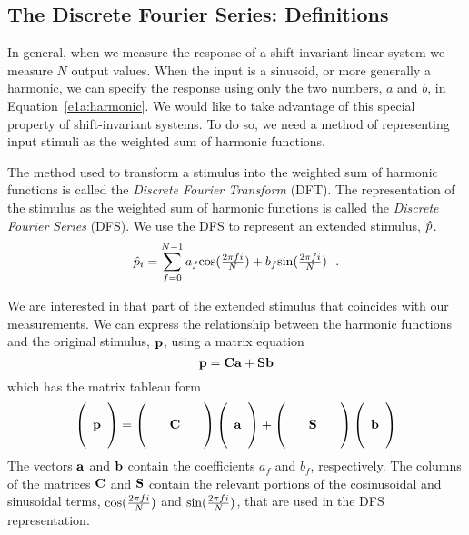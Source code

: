\subsection*{The Discrete Fourier Series:  Definitions}
In general, when we measure the response of a shift-invariant linear
system we measure $N$ output values.  When the input is a sinusoid, or
more generally a harmonic, we can specify the response using only the
two numbers, $a$ and $b$, in Equation~\ref{e1a:harmonic}.  We would
like to take advantage of this special property of shift-invariant systems.  To
do so, we need a method of representing input stimuli as the weighted
sum of harmonic functions.

The method used to transform a stimulus into the weighted sum of
harmonic functions is called the {\em Discrete Fourier Transform}
(DFT).  The representation of the stimulus as the weighted sum of
harmonic functions is called the {\em Discrete Fourier Series} (DFS).
We use the DFS to represent an extended stimulus, $\mbox{$\hat{p}_{}$}$.
\begin{equation}
\label{e1a:DFS}
\mbox{$\hat{p}_{i}$} = \sum_{f = 0}^{N - 1} a_f \mbox{$\cos ( \frac{2 \pi f i}{ N } )$} +  b_f \mbox{$\sin ( \frac {2 \pi f i}{ N } )$} ~~.
\end{equation}

We are interested in that part of the extended stimulus that coincides
with our measurements.  We can express the relationship between the
harmonic functions and the original stimulus, $\mbox {$\bf p$}{}$, using a
matrix equation
\begin{equation}
\label{e1a:dfs2}
\mbox {$\bf p$}{} = \mbox{$ \bf C$} \mbox{${\bf a}$} + \mbox{$ \bf S$} \mbox{${\bf b}$}
\end{equation}
which has the matrix tableau form
\begin{equation}
\left (  
 \begin{array}{c}    ~ \\   \mbox {$\bf p$}{} \\   ~ \end{array}
\right ) =
\left (
 \begin{array}{ccc} ~ & ~ &  ~ \\ ~ & \mbox{$ \bf C$} & ~\\ ~ &  ~ & ~ \end{array}
\right )
\left (
 \begin{array}{c}  ~ \\ \mbox{${\bf a }$} \\ ~ \end{array}
\right )
 +
\left (
 \begin{array}{ccc} ~ & ~ &  ~ \\ ~ & \mbox{$ \bf S$} & ~\\ ~ &  ~ & ~ \end{array}
\right ) 
\left(
 \begin{array}{c} ~ \\ \mbox{${\bf b}$} \\ ~ \end{array}
\right ) \nonumber
\end{equation}
The vectors ${\mbox{${\bf a}$}}$ and ${\mbox{${\bf b}$}}$ contain the coefficients
$a_f$ and $b_f$, respectively.  The columns of the matrices $\mbox{$ \bf C$}$
and $\mbox{$ \bf S$}$ contain the relevant portions of the cosinusoidal and
sinusoidal terms, $\mbox{$\cos ( \frac{2 \pi f i}{ N } )$}$ and $\mbox{$\sin ( \frac {2 \pi f i}{ N } )$}$, that are used in the DFS
representation.

